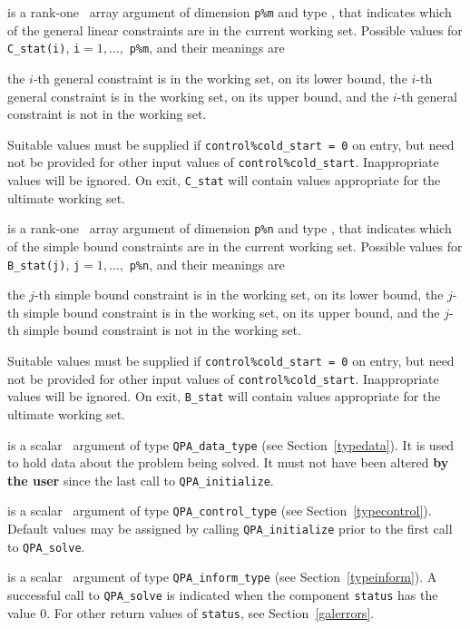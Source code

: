 \documentclass{galahad}
\newcommand{\packagename}{QPA}
\begin{document}
\begin{description}
 is a rank-one \intentinout\ array argument of dimension {\tt p\%m}
and type \integer, that indicates which of the general linear
constraints are in the current working set. Possible values for 
{\tt C\_stat(i)}, {\tt i}$=1, \ldots ,$ {\tt p\%m}, and their meanings are
\begin{description}
 the $i$-th general constraint 
is in the working set, on its lower bound,
 the $i$-th general constraint 
is in the working set, on its upper bound, and
  the $i$-th general constraint is not in the working set.
\end{description}
Suitable values must be supplied if  {\tt control\%cold\_start = 0} on entry,
but need not be provided for other input values of {\tt control\%cold\_start}.
Inappropriate values will be ignored.
On exit, {\tt C\_stat} will contain values appropriate for the ultimate
working set.

 is a rank-one \intentinout\ array argument of dimension {\tt p\%n}
and type \integer, that indicates which of the simple bound 
constraints are in the current working set. Possible values for 
{\tt B\_stat(j)}, {\tt j}$=1, \ldots ,$ {\tt p\%n}, and their meanings are
\begin{description}
 the $j$-th simple bound constraint 
is in the working set, on its lower bound,
 the $j$-th simple bound constraint 
is in the working set, on its upper bound, and
  the $j$-th simple bound constraint is not in the working set.
\end{description}
Suitable values must be supplied if  {\tt control\%cold\_start = 0} on entry,
but need not be provided for other input values of {\tt control\%cold\_start}.
Inappropriate values will be ignored.
On exit, {\tt B\_stat} will contain values appropriate for the ultimate
working set.

 is a scalar \intentinout\ argument of type 
{\tt \packagename\_data\_type}
(see Section~\ref{typedata}). It is used to hold data about the problem being 
solved. It must not have been altered {\bf by the user} since the last call to 
{\tt \packagename\_initialize}.

 is a scalar \intentin\ argument of type 
{\tt \packagename\_control\_type}
(see Section~\ref{typecontrol}). Default values may be assigned by calling 
{\tt \packagename\_initialize} prior to the first call to 
{\tt \packagename\_solve}.

 is a scalar \intentout\ argument of type 
{\tt \packagename\_inform\_type}
(see Section~\ref{typeinform}). A successful call to
{\tt \packagename\_solve}
is indicated when the  component {\tt status} has the value 0. 
For other return values of {\tt status}, see Section~\ref{galerrors}.


\end{description}
\end{document}
